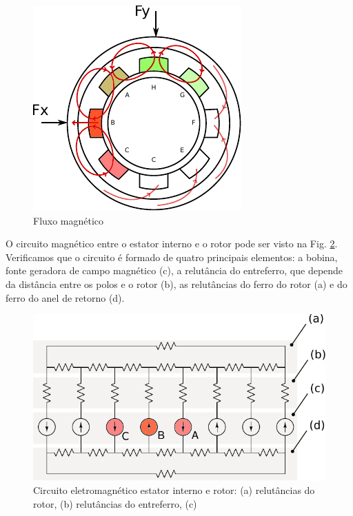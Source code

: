  \begin{figure}[ht!]
 	\centering
 	\includegraphics[width=0.7\linewidth]{./Figs/modelo_mancal_estator_interno_fluxo2}
 	\caption{Fluxo magnético}
 	\label{fig:modelo:mancal:estator:interno:fluxo2}
 \end{figure}

O circuito magnético entre o estator interno e o rotor pode ser visto na Fig. \ref{fig:modelo:circuito:ativo:explicativo}. Verificamos que o circuito é formado de quatro principais elementos: a bobina, fonte geradora de campo magnético (c), a relutância do entreferro, que depende da distância entre os polos e o rotor (b), as relutâncias do ferro do rotor (a) e do ferro do anel de retorno (d).

\begin{figure}[ht!]
\centering
\includegraphics[width=0.7\linewidth]{./Figs/modelo_circuito_ativo_explicativo}
\caption[Circuito eletromagnético estator interno e rotor]{Circuito eletromagnético estator interno e rotor: (a) relutâncias do rotor, (b) relutâncias do entreferro, (c) } 
\label{fig:modelo:circuito:ativo:explicativo}
\end{figure}

